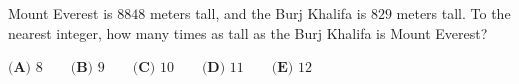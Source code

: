 Mount Everest is $8848$ meters tall, and the Burj Khalifa is $829$ meters tall. To the nearest integer, how many times as tall as the Burj Khalifa is Mount Everest?

$\textbf{(A) }8\qquad\textbf{(B) }9\qquad\textbf{(C) }10\qquad\textbf{(D) }11\qquad\textbf{(E) }12$
